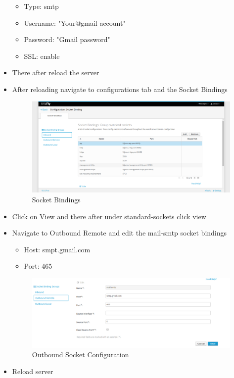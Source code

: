 \documentclass[11pt,a4paper]{article}
\begin{document}
\begin{itemize}
\begin{itemize}
		\item Type: smtp
		\item Username: "Your@gmail account"
		\item Password: "Gmail password"
		\item SSL: enable
	\end{itemize}
	\item There after reload the server
	\item After reloading navigate to configurations tab and the Socket Bindings
		\begin{figure}[H]
		\begin{center}
			\includegraphics[width=\linewidth]{../Images/socket}
			\caption{Socket Bindings}
		\end{center}
	\end{figure}
	\item Click on View and there after under standard-sockets click view
	\item Navigate to Outbound Remote and edit the mail-smtp socket bindings
		\begin{itemize}
		\item Host: smpt.gmail.com
		\item Port: 465
	\end{itemize}
	\begin{figure}[H]
	\begin{center}
		\includegraphics[width=\linewidth]{../Images/outbound}
		\caption{Outbound Socket Configuration}
	\end{center}
\end{figure}
	\item Reload server
\end{itemize}
\end{document}
